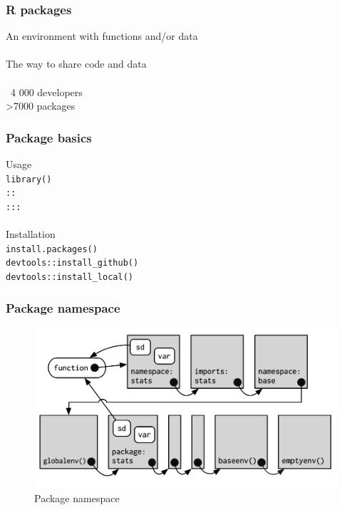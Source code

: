 \documentclass{beamer}
\begin{document}
\begin{frame}
	\frametitle{R packages}
	\begin{center}
		An environment with functions and/or data \\~\\
		The way to share code and data \\~\\		
		~4 000 developers \\
		\textgreater 7000 packages \\
	\end{center}
\end{frame}

\begin{frame}
	\frametitle{Package basics}
	\begin{center}
		Usage \\
		\texttt{library()} \\
		\texttt{::} \\
		\texttt{:::} \\~\\
		Installation \\
		\texttt{install.packages()} \\
		\texttt{devtools::install\_github()} \\
		\texttt{devtools::install\_local()} \\
	\end{center}
\end{frame}

\begin{frame}
	\frametitle{Package namespace}
	\begin{center}
		\begin{figure}[!ht]
			\includegraphics[scale=0.90]{figures/namespace}
			\caption{Package namespace}
			\label{fig:pkgns}
		\end{figure}
	\end{center}
\end{frame}
\end{document}
